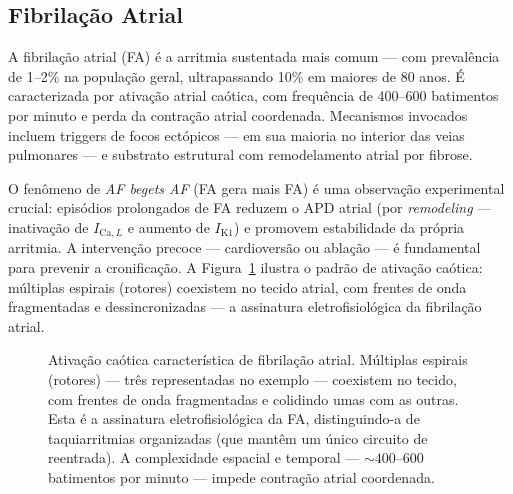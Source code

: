 \subsection{Fibrilação Atrial}
\label{sub:image12-fa}

A fibrilação atrial (FA) é a arritmia sustentada mais comum --- com
prevalência de 1--2\% na população geral, ultrapassando 10\% em maiores
de 80 anos. É caracterizada por ativação atrial caótica, com frequência
de 400--600 batimentos por minuto e perda da contração atrial coordenada.
Mecanismos invocados incluem triggers de focos ectópicos --- em sua
maioria no interior das veias pulmonares --- e substrato estrutural com
remodelamento atrial por fibrose.

O fenômeno de \emph{AF begets AF} (FA gera mais FA) é uma observação
experimental crucial: episódios prolongados de FA reduzem o APD atrial
(por \emph{remodeling} --- inativação de $I_{\mathrm{Ca},L}$ e aumento
de $I_{\mathrm{K1}}$) e promovem estabilidade da própria arritmia. A
intervenção precoce --- cardioversão ou ablação --- é fundamental para
prevenir a cronificação. A Figura~\ref{fig:12-fibrilacao}
ilustra o padrão de ativação caótica: múltiplas espirais (rotores)
coexistem no tecido atrial, com frentes de onda fragmentadas e
dessincronizadas --- a assinatura eletrofisiológica da fibrilação
atrial.

\begin{figure}[htbp]
\centering
{}
\caption{Ativação caótica característica de fibrilação atrial. Múltiplas espirais (rotores) --- três representadas no exemplo --- coexistem no tecido, com frentes de onda fragmentadas e colidindo umas com as outras. Esta é a assinatura eletrofisiológica da FA, distinguindo-a de taquiarritmias organizadas (que mantêm um único circuito de reentrada). A complexidade espacial e temporal --- $\sim 400$--$600$ batimentos por minuto --- impede contração atrial coordenada.}
\label{fig:12-fibrilacao}
\end{figure}

